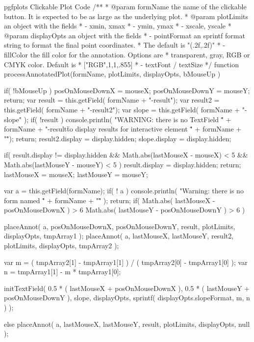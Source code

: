 {{\begin{insDLJS}[processAnnotatedPlot]{\jobname}{pgfplots Clickable Plot Code}
/**
 * @param formName the name of the clickable button. It is expected to be as large as the underlying plot.
 * @param plotLimits an object with the fields
 *   - xmin, xmax
 *   - ymin, ymax
 *   - xscale, yscale
 * @param displayOpts an object with the fields
 *   - pointFormat an sprintf format string to format the final point coordinates.
 *   The default is  "(\pgfplotsPERCENT.2f,\pgfplotsPERCENT.2f)"
 *   - fillColor the fill color for the annotation. Options are
 *    transparent, gray, RGB or CMYK color. Default is
 *       ["RGB",1,1,.855]
 *	 - textFont / textSize
 */
function processAnnotatedPlot(formName, plotLimits, displayOpts, bMouseUp ) 
{
	if( !bMouseUp ) {
		posOnMouseDownX = mouseX;
		posOnMouseDownY = mouseY;
		return;
	}
	var result = this.getField( formName + "-result");
	var result2 = this.getField( formName + "-result2");
	var slope 	= this.getField( formName + "-slope" );
	if( !result ) {
		console.println( "WARNING: there is no TextField \"" + formName + "-result\" to display results for interactive element \"" + formName + "\"");
		return;
	}
	result2.display = display.hidden;
	slope.display = display.hidden;

	if( result.display != display.hidden && 
		Math.abs(lastMouseX - mouseX) < 5 &&
		Math.abs(lastMouseY - mouseY) < 5 ) 
	{
		result.display = display.hidden;
		return;
	}
	lastMouseX = mouseX;
	lastMouseY = mouseY;

	var a = this.getField(formName);
	if( ! a ) {
		console.println( "Warning: there is no form named \"" + formName + "\"" );
		return;
	}
	if( Math.abs( lastMouseX - posOnMouseDownX ) > 6 \pgfplotsVERTBAR\pgfplotsVERTBAR
		Math.abs( lastMouseY - posOnMouseDownY ) > 6 )
	{
		placeAnnot( a, posOnMouseDownX, posOnMouseDownY, result, plotLimits, displayOpts, tmpArray1 );
		placeAnnot( a, lastMouseX, lastMouseY, result2, plotLimits, displayOpts, tmpArray2 );

		var m =  ( tmpArray2[1] - tmpArray1[1] ) / ( tmpArray2[0] - tmpArray1[0] );
		var n =  tmpArray1[1] - m * tmpArray1[0];

		initTextField( 
			0.5 * ( lastMouseX + posOnMouseDownX ),
			0.5 * ( lastMouseY + posOnMouseDownY ),
			slope,
			displayOpts,
			sprintf( displayOpts.slopeFormat, m, n ) );

	} else {
		placeAnnot( a, lastMouseX, lastMouseY, result, plotLimits, displayOpts, null );
	}
}
\end{insDLJS}

\newif\ifpgfplots@clickable
\newif\ifpgfplots@annot@printable

}}
